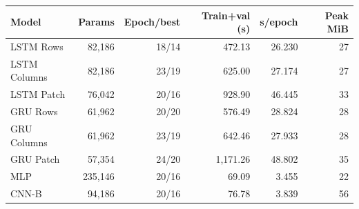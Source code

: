\begin{tabular}{lrrrrr}
\toprule
Model & Params & Epoch/best & Train+val (s) & s/epoch & Peak MiB\\
\midrule
LSTM Rows & 82,186 & 18/14 & 472.13 & 26.230 & 27\\
LSTM Columns & 82,186 & 23/19 & 625.00 & 27.174 & 27\\
LSTM Patch & 76,042 & 20/16 & 928.90 & 46.445 & 33\\
GRU Rows & 61,962 & 20/20 & 576.49 & 28.824 & 28\\
GRU Columns & 61,962 & 23/19 & 642.46 & 27.933 & 28\\
GRU Patch & 57,354 & 24/20 & 1,171.26 & 48.802 & 35\\
MLP & 235,146 & 20/16 & 69.09 & 3.455 & 22\\
CNN-B & 94,186 & 20/16 & 76.78 & 3.839 & 56\\
\bottomrule
\end{tabular}
